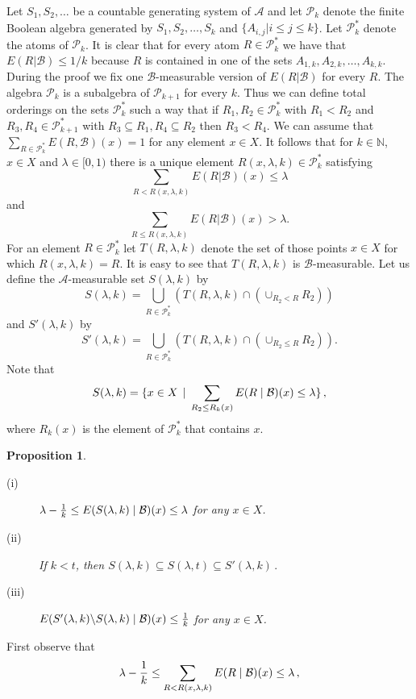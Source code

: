 \documentclass [11pt] {article}
\newtheorem{proposition}{Proposition}[section]
\def\proof{\smallskip\noindent{\it Proof.} }
\def\cB{\mbox{$\cal B$}}
\def\cB{\mbox{$\cal B$}}
\begin{document}
\proof
Let $S_1,S_2,\dots$ be a countable generating system of $\mathcal{A}$ and
  let $\mathcal{P}_k$ denote the finite Boolean
 algebra generated by $S_1,S_2,\dots,S_k$ and
  $\{A_{i,j}|i\leq j\leq k\}$. Let $\mathcal{P}_k^*$ denote the atoms of
  $\mathcal{P}_k$. It is clear that for every atom $R\in\mathcal{P}_k^*$ we
  have that $E(R|\mathcal{B})\leq 1/k$ because $R$ is contained in one of the
  sets $A_{1,k},A_{2,k},\dots,A_{k,k}$. During the proof we fix one
  $\mathcal{B}$-measurable version of $E(R|\mathcal{B})$ for every $R$. The
  algebra $\mathcal{P}_{k}$ is a subalgebra of $\mathcal{P}_{k+1}$ for every
  $k$. Thus we can define total orderings on the sets $\mathcal{P}_k^*$ such
  a way that if $R_1,R_2\in\mathcal{P}_k^*$ with $R_1<R_2$ and
  $R_3,R_4\in\mathcal{P}_{k+1}^*$ with $R_3\subseteq R_1, R_4\subseteq R_2$
  then $R_3<R_4$. We can assume that
  $\sum_{R\in\mathcal{P}_k^*}E(R,\mathcal{B})(x)=1$ for any element $x\in X$.
  It follows that for $k\in\mathbb{N}$, $x\in X$ and
  $\lambda\in [0,1)$ there is a
unique element $R(x,\lambda,k)\in\mathcal{P}_k^*$
  satisfying
$$\sum_{R<R(x,\lambda,k)}E(R|\mathcal{B})(x)\leq \lambda$$
and
$$\sum_{R\leq R(x,\lambda,k)}E(R|\mathcal{B})(x)>\lambda.$$
For an element $R\in\mathcal{P}_k^*$ let $T(R,\lambda,k)$ denote the
set of those points $x\in X$ for which $R(x,\lambda,k)=R$. It is
easy to see that $T(R,\lambda,k)$ is $\mathcal{B}$-measurable. Let
us define the $\mathcal{A}$-measurable set $S(\lambda,k)$ by
$$S(\lambda,k)=\bigcup_{R\in\mathcal{P}_k^*}(T(R,\lambda,k)
\cap(\cup_{R_2<R}R_2))$$
and $S'(\lambda,k)$ by
$$S'(\lambda,k)=\bigcup_{R\in\mathcal{P}_k^*}(T(R,\lambda,k)\cap(\cup_{R_2\leq
  R}R_2)).$$
Note that
$$S(\lambda,k)=\{x\in X\,\mid\,\sum_{R_2\leq R_k(x)} E(R\mid \cB)(x)\leq
\lambda\}\,,$$
where $R_k(x)$ is the element of $\mathcal{P}_k^*$ that contains $x$.
\begin{proposition} \label{propindep}
\begin{description}
\item[(i)] $\lambda-\frac{1}{k}\leq
E(S(\lambda,k)\mid \cB)(x)\leq \lambda$ for any $x\in X$.
\item[(ii)] If $k<t$, then
$S(\lambda,k)\subseteq S(\lambda,t)\subseteq S'(\lambda,k)\,.$
\item[(iii)] $E(S'(\lambda,k)\backslash S(\lambda,k)\mid\cB)(x)\leq
  \frac{1}{k} $ for any $x\in X$.
\end{description}
\end{proposition}
\proof
First observe that
$$ \lambda-\frac{1}{k}\leq \sum_{R< R(x,\lambda,k)}E(R\mid \cB)(x)\leq
\lambda\,,$$
\end{document}
